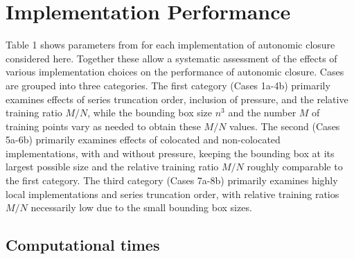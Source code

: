 \graphicspath{ {./Ch5/}  } 

%




%

\chapter{Implementation Performance}
\label{ch:5}

Table 1 shows parameters from  for each implementation of autonomic closure considered here. Together these allow a systematic assessment of the effects of various implementation choices on the performance of autonomic closure. Cases are grouped into three categories. The first category (Cases 1a-4b) primarily examines effects of series truncation order, inclusion of pressure, and the relative training ratio $M/N$, while the bounding box size $n^3$ and the number $M$ of training points vary as needed to obtain these  $M/N$ values. The second (Cases 5a-6b) primarily examines effects of colocated and non-colocated implementations, with and without pressure, keeping the bounding box at its largest possible size and the relative training ratio  $M/N$ roughly comparable to the first category. The third category (Cases 7a-8b) primarily examines highly local implementations and series truncation order, with relative training ratios $M/N$  necessarily low due to the small bounding box sizes. 

\section{Computational times} 
\label{sec:IVA}

